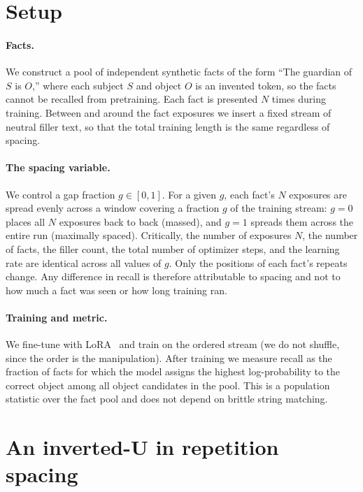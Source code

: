 \documentclass[10pt]{article}
\begin{document}
\section{Setup}
\label{sec:setup}

\paragraph{Facts.} We construct a pool of independent synthetic facts of the form ``The guardian of
$S$ is $O$,'' where each subject $S$ and object $O$ is an invented token, so the facts cannot be
recalled from pretraining. Each fact is presented $N$ times during training. Between and around the
fact exposures we insert a fixed stream of neutral filler text, so that the total training length
is the same regardless of spacing.

\paragraph{The spacing variable.} We control a gap fraction $g \in [0,1]$. For a given $g$, each
fact's $N$ exposures are spread evenly across a window covering a fraction $g$ of the training
stream: $g=0$ places all $N$ exposures back to back (massed), and $g=1$ spreads them across the
entire run (maximally spaced). Critically, the number of exposures $N$, the number of facts, the
filler count, the total number of optimizer steps, and the learning rate are identical across all
values of $g$. Only the positions of each fact's repeats change. Any difference in recall is
therefore attributable to spacing and not to how much a fact was seen or how long training ran.

\paragraph{Training and metric.} We fine-tune with LoRA~\citep{hu2022lora} and train on the ordered stream (we do not
shuffle, since the order is the manipulation). After training we measure recall as the fraction of
facts for which the model assigns the highest log-probability to the correct object among all
object candidates in the pool. This is a population statistic over the fact pool and does not
depend on brittle string matching.

\section{An inverted-U in repetition spacing}
\label{sec:invertedU}
\end{document}
